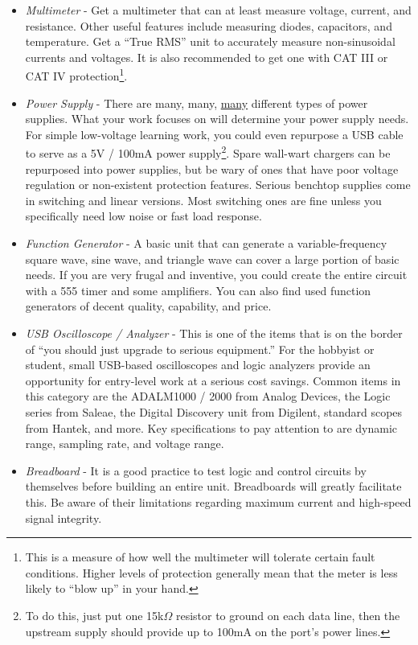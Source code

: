 \begin{itemize}
\item \emph{Multimeter} - Get a multimeter that can at least measure voltage, current, and resistance. Other useful features include measuring diodes, capacitors, and temperature. Get a ``True RMS'' unit to accurately measure non-sinusoidal currents and voltages. It is also recommended to get one with CAT III or CAT IV protection\footnote{This is a measure of how well the multimeter will tolerate certain fault conditions. Higher levels of protection generally mean that the meter is less likely to ``blow up'' in your hand.}.
\item \emph{Power Supply} - There are many, many, \underline{many} different types of power supplies. What your work focuses on will determine your power supply needs. For simple low-voltage learning work, you could even repurpose a USB cable to serve as a 5V / 100mA power supply\footnote{To do this, just put one 15k$\Omega$ resistor to ground on each data line, then the upstream supply should provide up to 100mA on the port's power lines.}. Spare wall-wart chargers can be repurposed into power supplies, but be wary of ones that have poor voltage regulation or non-existent protection features. Serious benchtop supplies come in switching and linear versions. Most switching ones are fine unless you specifically need low noise or fast load response.
\item \emph{Function Generator} - A basic unit that can generate a variable-frequency square wave, sine wave, and triangle wave can cover a large portion of basic needs. If you are very frugal and inventive, you could create the entire circuit with a 555 timer and some amplifiers. You can also find used function generators of decent quality, capability, and price.
\item \emph{USB Oscilloscope / Analyzer} - This is one of the items that is on the border of ``you should just upgrade to serious equipment.'' For the hobbyist or student, small USB-based oscilloscopes and logic analyzers provide an opportunity for entry-level work at a serious cost savings. Common items in this category are the ADALM1000 / 2000 from Analog Devices, the Logic series from Saleae, the Digital Discovery unit from Digilent, standard scopes from Hantek, and more. Key specifications to pay attention to are dynamic range, sampling rate, and voltage range.
\item \emph{Breadboard} - It is a good practice to test logic and control circuits by themselves before building an entire unit. Breadboards will greatly facilitate this. Be aware of their limitations regarding maximum current and high-speed signal integrity.
\end{itemize}

